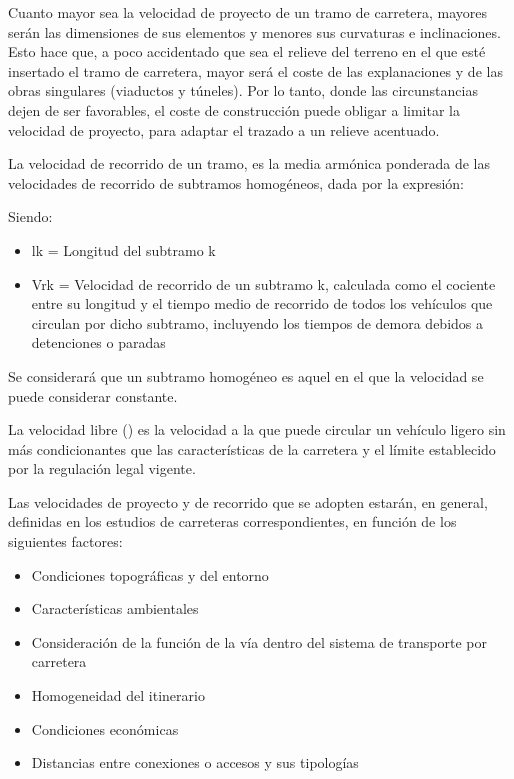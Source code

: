 \documentclass[letterpaper,10pt,english]{sphinxmanual}
\let\sphinxpxdimen\pdfpxdimen\else\newdimen\sphinxpxdimen
\begin{document}
Cuanto mayor sea la velocidad de proyecto de un tramo de carretera, mayores serán las dimensiones de sus elementos y menores sus curvaturas e inclinaciones. Esto hace que, a poco accidentado que sea el relieve del terreno en el que esté insertado el tramo de carretera, mayor será el coste de las explanaciones y de las obras singulares (viaductos y túneles). Por lo tanto, donde las circunstancias dejen de ser favorables, el coste de construcción puede obligar a limitar la velocidad de proyecto, para adaptar el trazado a un relieve acentuado.

La velocidad de recorrido de un tramo,  es la media armónica ponderada de las velocidades de recorrido de subtramos homogéneos, dada por la expresión:

\noindent\sphinxincludegraphics[width=200\sphinxpxdimen]{{formula1}.png}

Siendo:
\begin{itemize}
\item {} 
lk  = Longitud del subtramo k

\item {} 
Vrk = Velocidad de recorrido de un subtramo k, calculada como el cociente entre su longitud y el tiempo medio de recorrido de todos los vehículos que circulan por dicho subtramo, incluyendo los tiempos de demora debidos a detenciones o paradas

\end{itemize}

Se considerará que un subtramo homogéneo es aquel en el que la velocidad se puede considerar constante.

La velocidad libre () es la velocidad a la que puede circular un vehículo ligero sin más condicionantes que las características de la carretera y el límite establecido por la regulación legal vigente.

Las velocidades de proyecto y de recorrido que se adopten estarán, en general, definidas en los estudios de carreteras correspondientes, en función de los siguientes factores:
\begin{itemize}
\item {} 
Condiciones topográficas y del entorno

\item {} 
Características ambientales

\item {} 
Consideración de la función de la vía dentro del sistema de transporte por carretera

\item {} 
Homogeneidad del itinerario

\item {} 
Condiciones económicas

\item {} 
Distancias entre conexiones o accesos y sus tipologías

\end{itemize}
\end{document}
